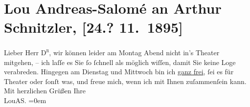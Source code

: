 

               \section[Lou Andreas-Salomé an Arthur Schnitzler, {[}24.? 11. 1895{]}]{ Lou Andreas-Salomé an Arthur Schnitzler, {[}24.? 11. 1895{]}}\nopagebreak{}\rehead{ }\normalsize\beginnumbering{} \toendnotes[C]{\smallbreak\pagebreak[2]} 
\pstart
           \noindent{}{\pb}Lieber Herr \textsc{D\textsuperscript{r}}, wir können leider am Montag Abend nicht in’s Theater
                    mitgehen, – ich laſſe es Sie ſo ſchnell als möglich wiſſen, damit Sie keine Loge
                    verabreden. Hingegen am Dienstag und Mittwoch bin ich
                        \uline{ganz frei}, ſei es für Theater oder ſonſt
                    was, und freue mich, wenn ich mit Ihnen zuſammenſein kann.\pend
           \pstart
           Mit herzlichen Grüßen Ihre{\\[\baselineskip]}\spacefill\mbox{LouAS.}\pend
           \leftskip=0em{}\endnumbering{}  
      